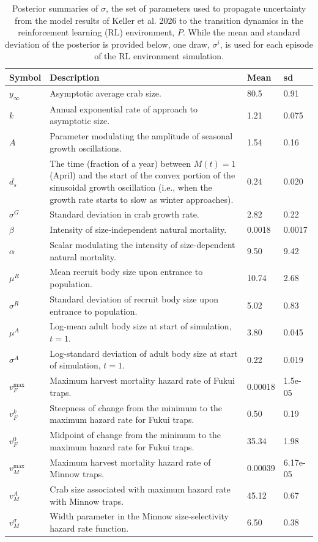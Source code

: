 \documentclass{article}
\begin{document}
\renewcommand{\thetable}{S\arabic{table}}
\begin{longtable}{||l p{9cm} l l||}
\caption{Posterior summaries of $\sigma$, the set of parameters used to propagate uncertainty from the model results of Keller et al. 2026 to the transition dynamics in the reinforcement learning (RL) environment, $P$. While the mean and standard deviation of the posterior is provided below, one draw, $\sigma^i$, is used for each episode of the RL environment simulation.}
 \hline
 \textbf{Symbol} & \textbf{Description} & \textbf{Mean} & \textbf{sd} \\ [0.5ex]
 \hline\hline
 $y_\infty$ & Asymptotic average crab size. & 80.5 & 0.91 \\ 
 \hline
 $k$ & Annual exponential rate of approach to asymptotic size. & 1.21 & 0.075 \\ 
 \hline
 $A$ & Parameter modulating the amplitude of seasonal growth oscillations. & 1.54 & 0.16 \\ 
 \hline
 $d_s$ & The time (fraction of a year) between $M(t) = 1$ (April) and the start of the convex portion of the sinusoidal growth oscillation (i.e., when the growth rate starts to slow as winter approaches). & 0.24 & 0.020 \\ 
 \hline
 $\sigma^G$ & Standard deviation in crab growth rate. & 2.82 & 0.22 \\ 
 \hline
 $\beta$ & Intensity of size-independent natural mortality. & 0.0018 & 0.0017 \\ 
 \hline
 $\alpha$ & Scalar modulating the intensity of size-dependent natural mortality. & 9.50 & 9.42 \\ 
 \hline
 $\mu^R$ & Mean recruit body size upon entrance to population. & 10.74 & 2.68\\ 
 \hline
 $\sigma^R$ & Standard deviation of recruit body size upon entrance to population. & 5.02 & 0.83 \\ 
 \hline
 $\mu^A$ & Log-mean adult body size at start of simulation, $t=1$. & 3.80 & 0.045 \\ 
 \hline
 $\sigma^A$ & Log-standard deviation of adult body size at start of simulation, $t=1$. & 0.22 & 0.019 \\ 
 \hline
 $v_F^{\text{max}}$ & Maximum harvest mortality hazard rate of Fukui traps. & 0.00018 & 1.5e-05 \\ 
 \hline
 $v_F^{k}$ & Steepness of change from the minimum to the maximum hazard rate for Fukui traps. & 0.50 & 0.19 \\ 
 \hline
 $v_F^{0}$ & Midpoint of change from the minimum to the maximum hazard rate for Fukui traps. & 35.34 & 1.98 \\ 
 \hline
 $v_M^{\text{max}}$ & Maximum harvest mortality hazard rate of Minnow traps. & 0.00039 & 6.17e-05 \\ 
 \hline
 $v_M^{A}$ & Crab size associated with maximum hazard rate with Minnow traps. & 45.12 & 0.67 \\ 
 \hline
 $v_M^{\sigma}$ & Width parameter in the Minnow size-selectivity hazard rate function. & 6.50 & 0.38 \\ 
 \hline
 \end{longtable}
\end{document}

